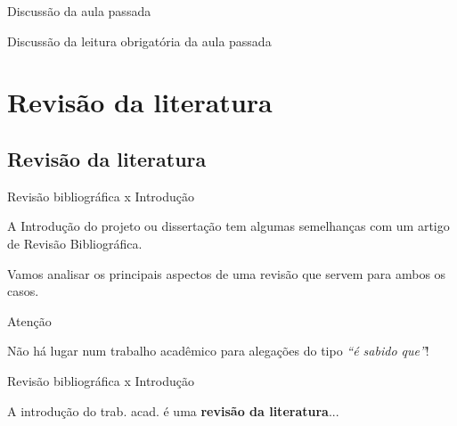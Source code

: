 \documentclass{beamer}
\begin{document}

\begin{frame}{Discussão da aula passada}
  \begin{block}{}
    Discussão da leitura obrigatória da aula passada
  \end{block}
\end{frame}

\section{Revisão da literatura}

\subsection{Revisão da literatura}

\begin{frame}{Revisão bibliográfica x Introdução}
  \begin{block}{}
    \footnotesize
    A Introdução do projeto ou dissertação tem algumas semelhanças com
    um artigo de Revisão Bibliográfica.

    \bigskip

    Vamos analisar os principais aspectos de uma revisão que servem
    para ambos os casos.
  \end{block}
\end{frame}

\begin{frame}
  \begin{block}{Atenção}
    \begin{center}
      Não há lugar num trabalho acadêmico para alegações do tipo {\em ``é sabido que''}!
    \end{center}
  \end{block}
\end{frame}

\begin{frame}{Revisão bibliográfica x Introdução}
  \begin{center}
    \footnotesize
    A introdução do trab. acad. é uma {\bf revisão da literatura}...

    \bigskip
    \normalsize
  \end{center}
\end{frame}
\end{document}
